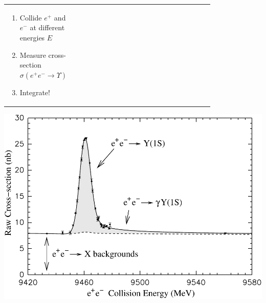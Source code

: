 \documentclass[landscape]{article}
\begin{document}
\begin{slide:technique}
\begin{center}
\begin{tabular}{p{0.25\linewidth} p{0.05\linewidth} p{0.5\linewidth}}
\begin{minipage}{\linewidth}
\begin{enumerate}
  \item Collide $e^+$ and $e^-$ at different energies $E$

  \item Measure cross-section $\sigma(e^+e^- \to \Upsilon)$

  \item Integrate!

\end{enumerate}
\end{minipage}
\end{tabular}
\end{center}

\end{slide:technique}

\begin{slide:technique}
\begin{center}
\includegraphics[width=0.9\linewidth]{plots/samplescan}
\end{center}
\end{slide:technique}
\end{document}
